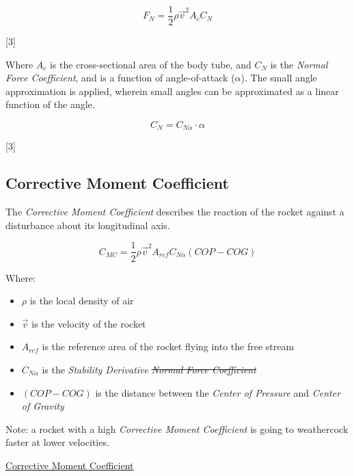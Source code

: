 \documentclass[]{book}
\providecommand{\tightlist}{%
  \setlength{\itemsep}{0pt}\setlength{\parskip}{0pt}}
\begin{document}
\begin{equation}
\label{rocket_normal_force}
F_{N} = \dfrac{1}{2} \rho \vec{v}^2 A_{c} C_N
\end{equation}

{[}3{]}

Where \(A_c\) is the cross-sectional area of the body tube, and \(C_N\)
is the \emph{Normal Force Coefficient}, and is a function of
angle-of-attack (\(\alpha\)). The small angle approximation is applied,
wherein small angles can be approximated as a linear function of the
angle.

\begin{equation}
\label{normal_force_coefficient}
C_N = C_{N \alpha} \cdot \alpha
\end{equation}

{[}3{]}

\subsection{Corrective Moment
Coefficient}\label{corrective-moment-coefficient}

The \emph{Corrective Moment Coefficient} describes the reaction of the
rocket against a disturbance about its longitudinal axis.

\begin{equation}
\label{eq_coef_moment_corrective}
C_{MC} = \dfrac{1}{2} \rho \vec{v}^2 A_{ref} C_{N \alpha} (COP-COG)
\end{equation}

Where:

\begin{itemize}
\tightlist
\item
  \(\rho\) is the local density of air
\item
  \(\vec{v}\) is the velocity of the rocket
\item
  \(A_{ref}\) is the reference area of the rocket flying into the free
  stream
\item
  \(C_{N \alpha}\) is the \emph{Stability Derivative} \sout{\emph{Normal
  Force Coefficient}}
\item
  \((COP-COG)\) is the distance between the \emph{Center of Pressure}
  and \emph{Center of Gravity}
\end{itemize}

Note: a rocket with a high \emph{Corrective Moment Coefficient} is going
to weathercock faster at lower velocities.

\href{https://www.apogeerockets.com/education/downloads/Newsletter193.pdf}{Corrective
Moment Coefficient}
\end{document}
